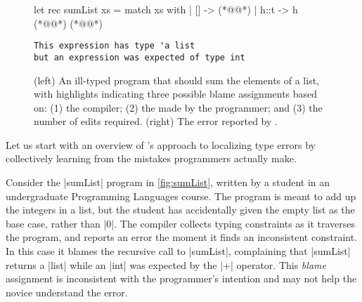 \label{sec:nate:overview}


\begin{figure}[t!]
\small
\begin{minipage}{0.47\linewidth}
\begin{ecode}
  let rec sumList xs =
    match xs with
    | []   -> (*@\hlTree{\hlSherrloc{[]}}@*)
    | h::t -> h (*@\hlTree{+}@*) (*@@*)
\end{ecode}
\end{minipage}
\begin{minipage}{0.5\linewidth}
\begin{verbatim}
This expression has type 'a list
but an expression was expected of type int
\end{verbatim}
\end{minipage}
\caption{(left) An ill-typed \ocaml program that should sum the elements of a
  list, with highlights indicating three possible blame assignments based on:
  (1) the \hlFix{\ocaml} compiler;
  (2) the  made by the programmer; and
  (3)  the number of edits required.
  (right) The error reported by \ocaml.}
\label{fig:sumList}
\end{figure}


Let us start with an overview of \toolname's
approach to localizing type errors by
collectively learning from the mistakes
programmers actually make.

%
Consider the |sumList| program in
\autoref{fig:sumList}, written by
a student in an undergraduate
Programming Languages course.
%
The program is meant to add up the
integers in a list, but the student
has accidentally given the empty
list as the base case, rather than |0|.
%
The \ocaml compiler collects typing
constraints as it traverses the program,
and reports an error the moment it finds
an inconsistent constraint.
%
In this case it blames the recursive call
to |sumList|, complaining that |sumList|
returns a |list| while an |int| was
expected by the |+| operator.
%
This \emph{blame} assignment is inconsistent
with the programmer's intention and may
not help the novice understand the error.


